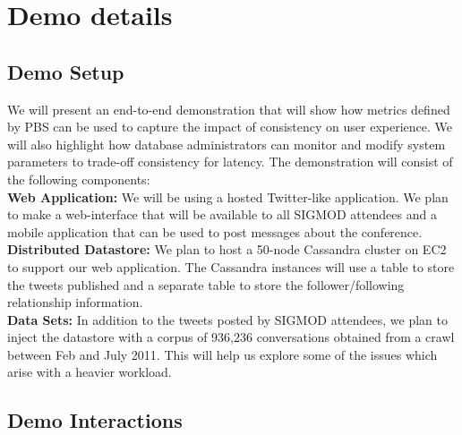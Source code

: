 \section{Demo details}
\label{sec:demo}



\subsection{Demo Setup}
We will present an end-to-end demonstration that will show how metrics defined
by PBS can be used to capture the impact of consistency on user experience. We
will also highlight how database administrators can monitor and modify system
parameters to trade-off consistency for latency. The demonstration will consist
of the following components:\\


\textbf{Web Application:} We will be using a hosted Twitter-like application. We
plan to make a web-interface that will be available to all SIGMOD attendees and
a mobile application that can be used to post messages about the conference.\\

\textbf{Distributed Datastore:} We plan to host a 50-node Cassandra cluster on
EC2 to support our web application. The Cassandra instances will use a table to
store the tweets published and a separate table to store the follower/following
relationship information.\\

\textbf{Data Sets:} In addition to the tweets posted by SIGMOD attendees, we
plan to inject the datastore with a corpus of 936,236 conversations obtained
from a crawl between Feb and July 2011. This will help us explore some of the
issues which arise with a heavier workload.

\subsection{Demo Interactions}

